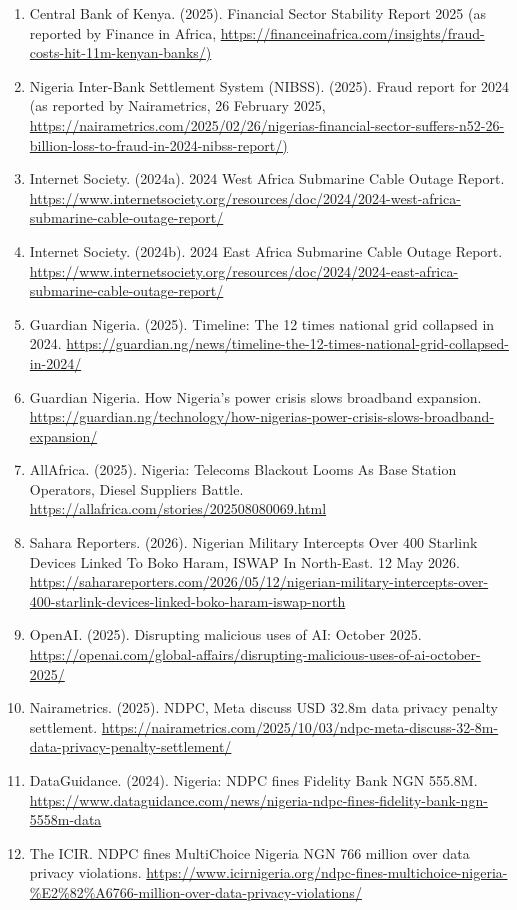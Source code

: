 {\begin{enumerate}
\item Central Bank of Kenya. (2025). Financial Sector Stability Report 2025 (as reported by Finance in Africa, \url{https://financeinafrica.com/insights/fraud-costs-hit-11m-kenyan-banks/)}
\item Nigeria Inter-Bank Settlement System (NIBSS). (2025). Fraud report for 2024 (as reported by Nairametrics, 26 February 2025, \url{https://nairametrics.com/2025/02/26/nigerias-financial-sector-suffers-n52-26-billion-loss-to-fraud-in-2024-nibss-report/)}
\item Internet Society. (2024a). 2024 West Africa Submarine Cable Outage Report. \url{https://www.internetsociety.org/resources/doc/2024/2024-west-africa-submarine-cable-outage-report/}
\item Internet Society. (2024b). 2024 East Africa Submarine Cable Outage Report. \url{https://www.internetsociety.org/resources/doc/2024/2024-east-africa-submarine-cable-outage-report/}
\item Guardian Nigeria. (2025). Timeline: The 12 times national grid collapsed in 2024. \url{https://guardian.ng/news/timeline-the-12-times-national-grid-collapsed-in-2024/}
\item Guardian Nigeria. How Nigeria's power crisis slows broadband expansion. \url{https://guardian.ng/technology/how-nigerias-power-crisis-slows-broadband-expansion/}
\item AllAfrica. (2025). Nigeria: Telecoms Blackout Looms As Base Station Operators, Diesel Suppliers Battle. \url{https://allafrica.com/stories/202508080069.html}
\item Sahara Reporters. (2026). Nigerian Military Intercepts Over 400 Starlink Devices Linked To Boko Haram, ISWAP In North-East. 12 May 2026. \url{https://saharareporters.com/2026/05/12/nigerian-military-intercepts-over-400-starlink-devices-linked-boko-haram-iswap-north}
\item OpenAI. (2025). Disrupting malicious uses of AI: October 2025. \url{https://openai.com/global-affairs/disrupting-malicious-uses-of-ai-october-2025/}
\item Nairametrics. (2025). NDPC, Meta discuss USD 32.8m data privacy penalty settlement. \url{https://nairametrics.com/2025/10/03/ndpc-meta-discuss-32-8m-data-privacy-penalty-settlement/}
\item DataGuidance. (2024). Nigeria: NDPC fines Fidelity Bank NGN 555.8M. \url{https://www.dataguidance.com/news/nigeria-ndpc-fines-fidelity-bank-ngn-5558m-data}
\item The ICIR. NDPC fines MultiChoice Nigeria NGN 766 million over data privacy violations. \url{https://www.icirnigeria.org/ndpc-fines-multichoice-nigeria-\%E2\%82\%A6766-million-over-data-privacy-violations/}

\end{enumerate}}
